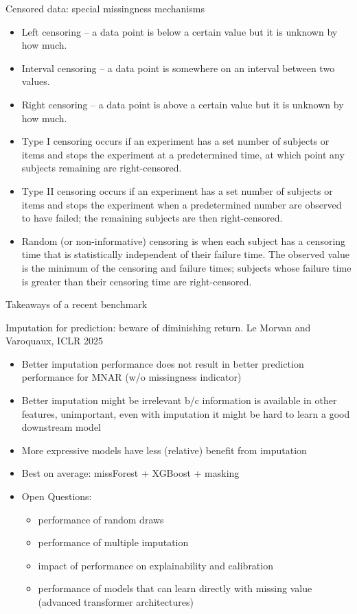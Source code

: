 \documentclass[11pt,compress,t,notes=noshow, xcolor=table]{beamer}
\begin{document}
\begin{frame}{Censored data: special missingness mechanisms}
    \small
    \begin{itemize}
        \item Left censoring – a data point is below a certain value but it is unknown by how much.
        \item Interval censoring – a data point is somewhere on an interval between two values.
        \item Right censoring – a data point is above a certain value but it is unknown by how much.
        \item Type I censoring occurs if an experiment has a set number of subjects or items and stops the experiment at a predetermined time, at which point any subjects remaining are right-censored.
        \item Type II censoring occurs if an experiment has a set number of subjects or items and stops the experiment when a predetermined number are observed to have failed; the remaining subjects are then right-censored.
        \item Random (or non-informative) censoring is when each subject has a censoring time that is statistically independent of their failure time. The observed value is the minimum of the censoring and failure times; subjects whose failure time is greater than their censoring time are right-censored.
    \end{itemize}
\end{frame}

\begin{frame}{Takeaways of a recent benchmark}

Imputation for prediction: beware of diminishing return. Le Morvan and Varoquaux, ICLR 2025 

\begin{itemize}
    \item Better imputation performance does not result in better prediction performance for MNAR (w/o missingness indicator)
    \item Better imputation might be irrelevant b/c information is available in other features, unimportant, even with imputation it might be hard to learn a good downstream model
    \item More expressive models have less (relative) benefit from imputation
    \item Best on average: missForest + XGBoost + masking
    \item Open Questions:
    \begin{itemize}
        \item performance of random draws
        \item performance of multiple imputation
        \item impact of performance on explainability and calibration
        \item performance of models that can learn directly with missing value (advanced transformer architectures)
    \end{itemize}
\end{itemize}
    
\end{frame}
\end{document}
